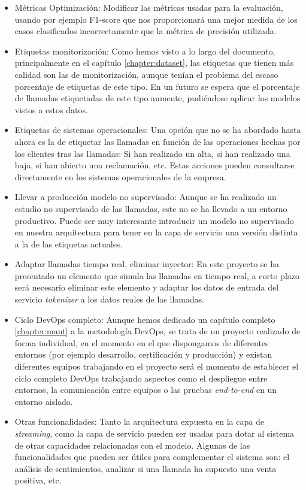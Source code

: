 \begin{itemize}
	\item Métricas Optimización: Modificar las métricas usadas para la evaluación, usando por ejemplo F1-score que nos proporcionará una mejor medida de los casos clasificados incorrectamente que la métrica de precisión utilizada.
	\item Etiquetas monitorización: Como hemos visto a lo largo del documento, principalmente en el capítulo \ref{chapter:dataset}, las etiquetas que tienen más calidad son las de monitorización, aunque tenían el problema del escaso porcentaje de etiquetas de este tipo. En un futuro se espera que el porcentaje de llamadas etiquetadas de este tipo aumente, pudiéndose aplicar los modelos vistos a estos datos.
	\item Etiquetas de sistemas operacionales: Una  opción que no se ha abordado hasta ahora es la de etiquetar las llamadas en función de las operaciones hechas por los clientes tras las llamadas: Si han realizado un alta, si han realizado una baja, si han abierto una reclamación, etc. Estas acciones pueden consultarse directamente en los sistemas operacionales de la empresa.
	\item Llevar a producción modelo no supervisado: Aunque se ha realizado un estudio no supervisado de las llamadas, este no se ha llevado a un entorno productivo. Puede ser muy interesante introducir un modelo no supervisado en nuestra arquitectura para tener en la capa de servicio una versión distinta a la de las etiquetas actuales. 
	\item Adaptar llamadas tiempo real, eliminar inyector: En este proyecto se ha presentado un elemento que simula las llamadas en tiempo real, a corto plazo será necesario eliminar este elemento y adaptar los datos de entrada del servicio \textit{tokenizer} a los datos reales de las llamadas. 
	
	\item Ciclo DevOps completo: Aunque hemos dedicado un capítulo completo \ref{chapter:mant} a la metodología DevOps, se trata de un proyecto realizado de forma individual, en el momento en el que dispongamos de diferentes entornos (por ejemplo desarrollo, certificación y producción) y existan diferentes equipos trabajando en el proyecto será el momento de establecer el ciclo completo DevOps trabajando aspectos como el despliegue entre entornos, la comunicación entre equipos o las pruebas \textit{end-to-end} en un entorno aislado.
	
	
	\item Otras funcionalidades: Tanto la arquitectura expuesta en la capa de \textit{streaming}, como la capa de servicio pueden ser usadas para dotar al sistema de otras capacidades relacionadas con el modelo. Algunas de las funcionalidades que pueden ser útiles para complementar el sistema son: el análisis de sentimientos, analizar si una llamada ha supuesto una venta positiva, etc. 


\end{itemize}

